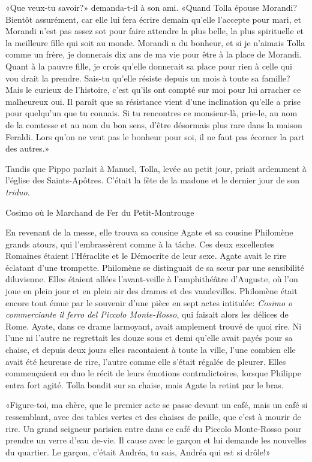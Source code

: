 «Que veux-tu savoir?» demanda-t-il à son ami. «Quand Tolla épouse
Morandi? Bientôt assurément, car elle lui fera écrire demain qu'elle
l'accepte pour mari, et Morandi n'est pas assez sot pour faire attendre
la plus belle, la plus spirituelle et la meilleure fille qui soit au
monde. Morandi a du bonheur, et si je n'aimais Tolla comme un frère, je
donnerais dix ans de ma vie pour être à la place de Morandi. Quant à la
pauvre fille, je crois qu'elle donnerait sa place pour rien à celle qui
vou drait la prendre. Sais-tu qu'elle résiste depuis un mois à toute sa
famille? Mais le curieux de l'histoire, c'est qu'ils ont compté sur moi
pour lui arracher ce malheureux oui. Il paraît que sa résistance vient
d'une inclination qu'elle a prise pour quelqu'un que tu connais. Si tu
rencontres ce monsieur-là, prie-le, au nom de la comtesse et au nom du
bon sens, d'être désormais plus rare dans la maison Feraldi. Lors qu'on
ne veut pas le bonheur pour soi, il ne faut pas écorner la part des
autres.»

Tandis que Pippo parlait à Manuel, Tolla, levée au petit jour, priait
ardemment à l'église des Saints-Apôtres. C'était la fête de la madone et
le dernier jour de son \emph{triduo}.

Cosimo où le Marchand de Fer du Petit-Montrouge

En revenant de la messe, elle trouva sa cousine Agate et sa cousine
Philomène grands atours, qui l'embrassèrent comme à la tâche. Ces deux
excellentes Romaines étaient l'Héraclite et le Démocrite de leur sexe.
Agate avait le rire éclatant d'une trompette. Philomène se distinguait
de sa sœur par une sensibilité diluvienne. Elles étaient allées
l'avant-veille à l'amphithéâtre d'Auguste, où l'on joue en plein jour et
en plein air des drames et des vaudevilles. Philomène était encore tout
émue par le souvenir d'une pièce en sept actes intitulée: \emph{Cosimo o
commerciante il ferro del Piccolo Monte-Rosso}, qui faisait alors les
délices de Rome. Ayate, dans ce drame larmoyant, avait amplement trouvé
de quoi rire. Ni l'une ni l'autre ne regrettait les douze sous et demi
qu'elle avait payés pour sa chaise, et depuis deux jours elles
racontaient à toute la ville, l'une combien elle avait été heureuse de
rire, l'autre comme elle s'était régalée de pleurer. Elles commençaient
en duo le récit de leurs émotions contradictoires, lorsque Philippe
entra fort agité. Tolla bondit sur sa chaise, mais Agate la retint par
le bras.

«Figure-toi, ma chère, que le premier acte se passe devant un café, mais
un café si ressemblant, avec des tables vertes et des chaises de paille,
que c'est à mourir de rire. Un grand seigneur parisien entre dans ce
café du Piccolo Monte-Rosso pour prendre un verre d'eau de-vie. Il cause
avec le garçon et lui demande les nouvelles du quartier. Le garçon,
c'était Andréa, tu sais, Andréa qui est si drôle!»

